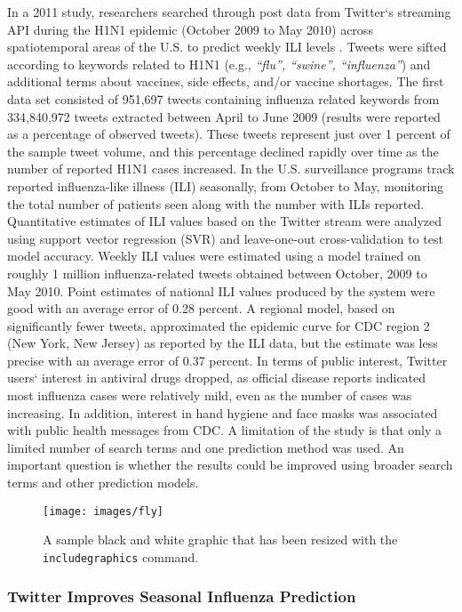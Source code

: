 \documentclass[sigconf]{acmart}
\begin{document}
In a 2011 study, researchers searched through post data from Twitter`s streaming API 
during the H1N1 epidemic (October 2009 to May 2010) across spatiotemporal areas of the 
U.S. to predict weekly ILI levels \cite{signorini11}. Tweets were sifted according to 
keywords related to H1N1 (e.g., {\it ``flu'', ``swine'', ``influenza''}) and additional 
terms about vaccines, side effects, and/or vaccine shortages. The first data set consisted 
of 951,697 tweets containing influenza related keywords from 334,840,972 tweets extracted 
between April to June 2009 (results were reported as a percentage of observed tweets). 
These tweets represent just over 1 percent of the sample tweet volume, and this percentage 
declined rapidly over time as the number of reported H1N1 cases increased. In the U.S. 
surveillance programs track reported influenza-like illness (ILI) seasonally, from October 
to May, monitoring the total number of patients seen along with the number with ILIs 
reported. Quantitative estimates of ILI values based on the Twitter stream were analyzed 
using support vector regression (SVR) and leave-one-out cross-validation to test model 
accuracy. Weekly ILI values were estimated using a model trained on roughly 1 million
influenza-related tweets obtained between October, 2009 to May 2010. Point estimates of 
national ILI values produced by the system were good with an average error of 0.28 percent. 
A regional model, based on significantly fewer tweets, approximated the epidemic curve for 
CDC region 2 (New York, New Jersey) as reported by the ILI data, but the estimate was less 
precise with an average error of 0.37 percent. In terms of public interest, Twitter users` 
interest in antiviral drugs dropped, as official disease reports indicated most 
influenza cases were relatively mild, even as the number of cases was increasing. In 
addition, interest in hand hygiene and face masks was associated with public health 
messages from CDC. A limitation of the study is that only a limited number of search 
terms and one prediction method was used. An important question is whether the results 
could be improved using broader search terms and other prediction models. 

\begin{figure}
\texttt{[image: images/fly]}
\caption{A sample black and white graphic
that has been resized with the \texttt{includegraphics} command.}
\end{figure}


\subsubsection{Twitter Improves Seasonal Influenza Prediction}
\end{document}
